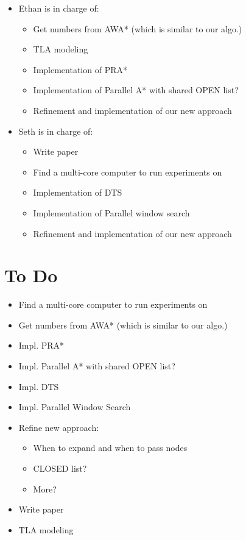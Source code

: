 \documentclass{article}
\begin{document}
\begin{itemize}
\item Ethan is in charge of:
  \begin{itemize}
  \item Get numbers from AWA* (which is similar to our algo.)
  \item TLA modeling
  \item Implementation of PRA*
  \item Implementation of Parallel A* with shared OPEN list?
  \item Refinement and implementation of our new approach
  \end{itemize}
\item Seth is in charge of:
  \begin{itemize}
  \item Write paper
  \item Find a multi-core computer to run experiments on
  \item Implementation of DTS
  \item Implementation of Parallel window search
  \item Refinement and implementation of our new approach
  \end{itemize}
\end{itemize}

\section{To Do}

\begin{itemize}
\item Find a multi-core computer to run experiments on
\item Get numbers from AWA* (which is similar to our algo.)
\item Impl. PRA*
\item Impl. Parallel A* with shared OPEN list?
\item Impl. DTS
\item Impl. Parallel Window Search
\item Refine new approach:
  \begin{itemize}
  \item When to expand and when to pass nodes
  \item CLOSED list?
  \item More?
  \end{itemize}
\item Write paper
\item TLA modeling
\end{itemize}
\end{document}
